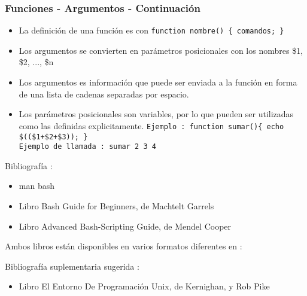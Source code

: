 \documentclass{beamer}
\begin{document}
\begin{frame}
\frametitle{Funciones - Argumentos - Continuación}
\begin{itemize}
\item La definición de una función es con \texttt{function nombre() \{ comandos; \} }
\item Los argumentos se convierten en parámetros posicionales con los nombres \$1, \$2, ..., \$n
\item Los argumentos es información que puede ser enviada a la función en forma de una lista de cadenas separadas por espacio.\\ 
\item Los parámetros posicionales son variables, por lo que pueden ser utilizadas como las definidas explicitamente.
\texttt{Ejemplo : function sumar()\{ echo \$((\$1+\$2+\$3)); \} }\\ 
\texttt{Ejemplo de llamada : sumar 2 3 4 }
\end{itemize}
\end{frame}






\begin{frame}
Bibliografía : 
\begin{itemize}
\item man bash
\item Libro Bash Guide for Beginners, de Machtelt Garrels 
\item Libro Advanced Bash-Scripting Guide, de Mendel Cooper
\end{itemize}

Ambos libros están disponibles en varios formatos diferentes en :

Bibliografía suplementaria sugerida : 
\begin{itemize}
\item Libro El Entorno De Programación Unix, de Kernighan, y Rob Pike
\end{itemize}

\end{frame}
\end{document}
